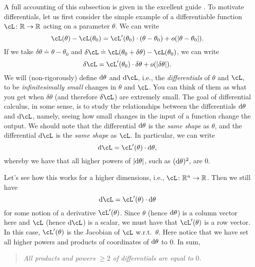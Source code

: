 \documentclass[../../book-main.tex]{subfiles}
\begin{document}
A full accounting of this subsection is given in the excellent guide \cite{bright2025matrix}. To motivate differentials, let us first consider the simple example of a differentiable function \(\cL \colon \R \to \R\) acting on a parameter \(\theta\). We can write 
\begin{equation}
    \cL(\theta) - \cL(\theta_{0}) = \cL^{\prime}(\theta_{0})\cdot(\theta - \theta_{0}) + o(\abs{\theta - \theta_{0}}).
\end{equation}
If we take \(\delta\theta \doteq \theta - \theta_{0}\) and \(\delta\cL \doteq \cL(\theta_{0} + \delta\theta) - \cL(\theta_{0})\), we can write 
\begin{equation}
    \delta\cL = \cL^{\prime}(\theta_{0})\cdot\delta\theta + o(\abs{\delta\theta}).
\end{equation}
We will (non-rigorously) define \(\mathrm{d}\theta\) and \(\odif{\cL}\), i.e., the \textit{differentials} of \(\theta\) and \(\cL\), to be \textit{infinitesimally small} changes in \(\theta\) and \(\cL\). You can think of them as what you get when \(\delta\theta\) (and therefore \(\delta \cL\)) are extremely small. The goal of differential calculus, in some sense, is to study the relationships between the differentials \(\mathrm{d}\theta\) and \(\odif{\cL}\), namely, seeing how small changes in the input of a function change the output. We should note that the differential \(\mathrm{d}\theta\) is the \textit{same shape} as \(\theta\), and the differential \(\odif{\cL}\) is the \textit{same shape} as \(\cL\). In particular, we can write 
\begin{equation}
    \odif{\cL} = \cL^{\prime}(\theta)\cdot\odif{\theta},
\end{equation}
whereby we have that all higher powers of \(\abs{\odif{\theta}}\), such as \((\mathrm{d}\theta)^{2}\), are \(0\).

Let's see how this works for a higher dimensions, i.e., \(\cL \colon \R^{n} \to \R\). Then we still have 
\begin{equation}
    \odif{\cL} = \cL^{\prime}(\theta)\cdot\odif{\theta}
\end{equation}
for some notion of a derivative \(\cL^{\prime}(\theta)\). Since \(\theta\) (hence \(\mathrm{d}\theta\)) is a column vector here and \(\cL\) (hence \(\odif{\cL}\)) is a scalar, we must have that \(\cL^{\prime}(\theta)\) is a row vector. In this case, \(\cL^{\prime}(\theta)\) is the Jacobian of \(\cL\) w.r.t.~\(\theta\). Here notice that we have set all higher powers and products of coordinates of \(\mathrm{d}\theta\)  to \(0\). In sum,
\begin{quote}
    \centering
    \textit{All products and powers \(\geq 2\) of differentials are equal to \(0\).}
\end{quote}
\end{document}
